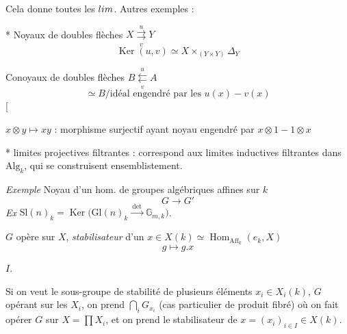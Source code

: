 \documentclass[11pt,a4paper]{article}
\begin{document}

Cela donne toutes les $\varprojlim$. Autres exemples :

* Noyaux de doubles flèches \quad $X \underset{v}{\overset{u}{\rightrightarrows}} Y$
\[
\operatorname{Ker}(u, v) \simeq X \times_{(Y \times Y)} \Delta_Y
\]


Conoyaux de doubles flèches \struck{\ill{}} \quad $B \underset{v}{\overset{u}{\leftleftarrows}} A$
\[
\simeq B / \text{idéal engendré par les } u(x) - v(x)
\]
[


$x \otimes y \mapsto xy$ : \quad morphisme surjectif ayant noyau engendré par $x \otimes 1 - 1 \otimes x$

* limites projectives filtrantes : correspond aux limites inductives filtrantes dans $\mathrm{Alg}_k$, qui se construisent ensemblistement.

\emph{Exemple} Noyau d'un hom. de groupes algébriques affines sur $k$
\[
G \longrightarrow G'
\]
\emph{Ex} \quad $\mathrm{Sl}(n)_k = \operatorname{Ker}\bigl(\mathrm{Gl}(n)_k \xrightarrow{\ \det\ } \mathbb{G}_{m,k}\bigr)$. \quad \struck{\ill{}}

$G$ opère sur $X$, \emph{stabilisateur} d'un $x \in X(k) \simeq \operatorname{Hom}_{\mathrm{Aff}_k}(e_k, X)$
\[
g \longmapsto g.x
\]



$I$.

Si on veut le sous-groupe de stabilité de plusieurs éléments $x_i \in X_i(k)$, $G$ opérant sur les $X_i$, on prend $\bigcap_i G_{x_i}$ (cas particulier de produit fibré) où on fait opérer $G$ sur $X = \prod X_i$, et on prend le stabilisateur de $x = (x_i)_{i \in I} \in X(k)$.
\end{document}
